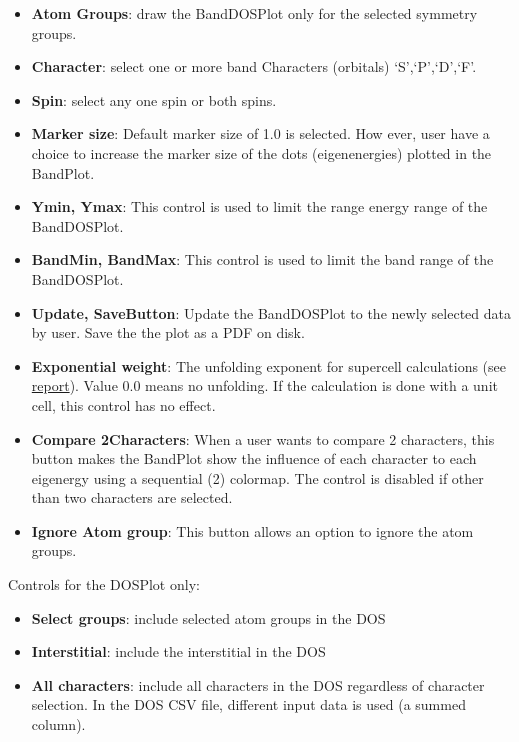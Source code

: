 \begin{itemize}
    \tightlist
\item
    \textbf{Atom Groups}: draw the BandDOSPlot only for the selected symmetry
    groups.
\item
    \textbf{Character}: select one or more band Characters (orbitals)
    `S',`P',`D',`F'.
\item
    \textbf{Spin}: select any one spin or both spins.
\item
    \textbf{Marker size}: Default marker size of 1.0 is selected. How ever, user
    have a choice to increase the marker size of the dots (eigenenergies)
    plotted in the BandPlot.
\item
    \textbf{Ymin, Ymax}: This control is used to limit the range energy range of
    the BandDOSPlot.
\item
    \textbf{BandMin, BandMax}: This control is used to limit the band range of the
    BandDOSPlot.
\item
    \textbf{Update, SaveButton}: Update the BandDOSPlot to the newly selected data
    by user. Save the the plot as a PDF on disk.
\item
    \textbf{Exponential weight}: The unfolding exponent for supercell calculations
    (see \href{./doc/report.pdf}{report}). Value 0.0 means no unfolding.
    If the calculation is done with a unit cell, this control has no
    effect.
\item
    \textbf{Compare 2Characters}: When a user wants to compare 2 characters, this
    button makes the BandPlot show the influence of each character to each
    eigenergy using a sequential (2) colormap. The control is disabled if
    other than two characters are selected.
\item
    \textbf{Ignore Atom group}: This button allows an option to ignore the atom
    groups.
\end{itemize}

Controls for the DOSPlot only:

\begin{itemize}
    \tightlist
\item
    \textbf{Select groups}: include selected atom groups in the DOS
\item
    \textbf{Interstitial}: include the interstitial in the DOS
\item
    \textbf{All characters}: include all characters in the DOS regardless of
    character selection. In the DOS CSV file, different input data is used
    (a summed column).
\end{itemize}

